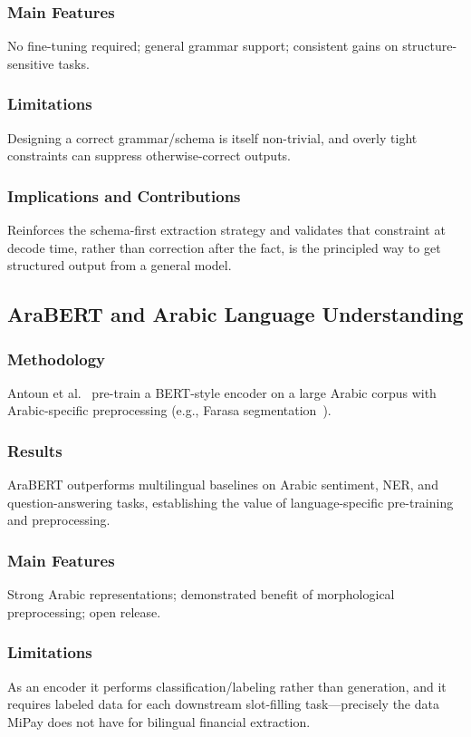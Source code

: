 \subsubsection{Main Features}
No fine-tuning required; general grammar support; consistent gains on
structure-sensitive tasks.

\subsubsection{Limitations}
Designing a correct grammar/schema is itself non-trivial, and overly tight
constraints can suppress otherwise-correct outputs.

\subsubsection{Implications and Contributions}
Reinforces the schema-first extraction strategy and validates that constraint at
decode time, rather than correction after the fact, is the principled way to get
structured output from a general model.

\subsection{AraBERT and Arabic Language Understanding}

\subsubsection{Methodology}
Antoun et al.~\cite{antoun2020arabert} pre-train a BERT-style encoder on a large
Arabic corpus with Arabic-specific preprocessing (e.g., Farasa
segmentation~\cite{abdelali2016farasa}).

\subsubsection{Results}
AraBERT outperforms multilingual baselines on Arabic sentiment, NER, and
question-answering tasks, establishing the value of language-specific
pre-training and preprocessing.

\subsubsection{Main Features}
Strong Arabic representations; demonstrated benefit of morphological
preprocessing; open release.

\subsubsection{Limitations}
As an encoder it performs classification/labeling rather than generation, and it
requires labeled data for each downstream slot-filling task---precisely the data
MiPay does not have for bilingual financial extraction.


